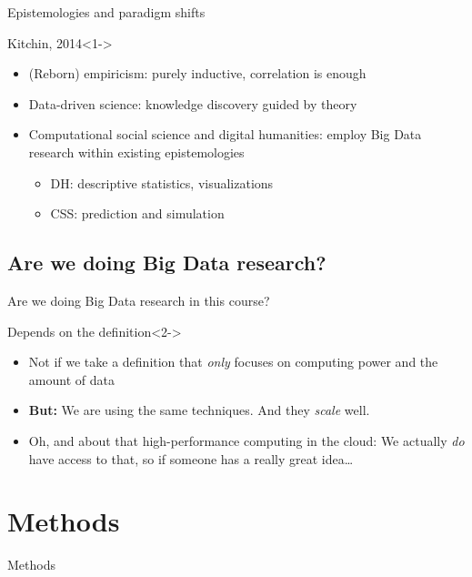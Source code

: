 \documentclass{beamer}
\begin{document}
\begin{frame}{Epistemologies and paradigm shifts}
	\begin{block}{Kitchin, 2014}<1->
		\begin{itemize}
			\item<2-> (Reborn) empiricism: purely inductive, correlation is enough
			\item<3-> Data-driven science: knowledge discovery guided by theory
			\item<4-> Computational social science and digital humanities: employ Big Data research within existing epistemologies
			\begin{itemize}
				\item DH: descriptive statistics, visualizations
				\item CSS: prediction and simulation
			\end{itemize}
		\end{itemize}
	\end{block}
\end{frame}




\subsection{Are we doing Big Data research?}

\begin{frame}{Are we doing Big Data research in this course?}
\begin{block}{Depends on the definition}<2->
\begin{itemize}
\item Not if we take a definition that \emph{only} focuses on computing power and the amount of data
\item<3-> \textbf{But:} We are using the same techniques. And they \emph{scale} well.
\item<4-> Oh, and about that high-performance computing in the cloud: We actually \emph{do} have access to that, so if someone has a really great idea\ldots
\end{itemize}

\end{block}
\end{frame}




\section{Methods}
\begin{frame}
Methods
\end{frame}
\end{document}
